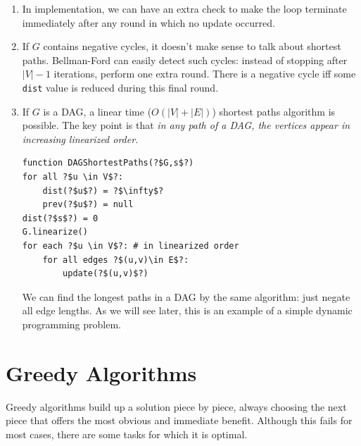 \documentclass[10pt]{article}
\begin{document}
\begin{multicols}{2}
\begin{addmargin}[0.8em]{0.5em}
\begin{enumerate}[label=(\alph*)]
\begin{verbatim}
function update(?$(u,v)\in E$?)
dist(?$v$?) = min(dist(?$v$?), dist(?$u$?) + ?$l(u,v)$?)
\end{verbatim}
\item In implementation, we can have an extra check to make the loop terminate immediately after any round in which no update occurred.
\item If $G$ contains negative cycles, it doesn't make sense to talk about shortest paths. Bellman-Ford can easily detect such cycles: instead of stopping after $|V| - 1$ iterations, perform one extra round. There is a negative cycle iff some \texttt{dist} value is reduced during this final round.

\item If $G$ is a DAG, a linear time ($O(|V| + |E|)$) shortest paths algorithm is possible. The key point is that \textit{in any path of a DAG, the vertices appear in increasing linearized order.} 
\begin{verbatim}
function DAGShortestPaths(?$G,s$?)
for all ?$u \in V$?:
    dist(?$u$?) = ?$\infty$?
    prev(?$u$?) = null
dist(?$s$?) = 0
G.linearize()
for each ?$u \in V$?: # in linearized order
    for all edges ?$(u,v)\in E$?:
        update(?$(u,v)$?)
\end{verbatim}

    We can find the longest paths in a DAG by the same algorithm: just negate all edge lengths. As we will see later, this is an example of a simple dynamic programming problem.
 
    \end{enumerate}
\end{addmargin}

\section{Greedy Algorithms}
\begin{addmargin}[0.8em]{0.5em}
Greedy algorithms build up a solution piece by piece, always choosing the next piece that offers the most obvious and immediate benefit. Although this fails for most cases, there are some tasks for which it is optimal.

\end{addmargin}
\end{multicols}
\end{document}
